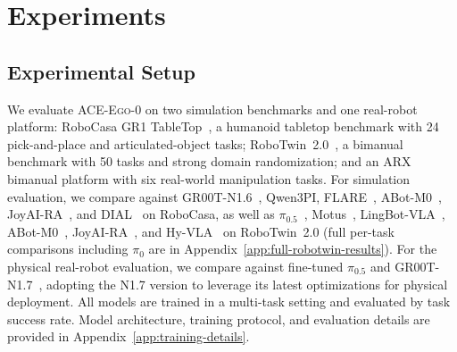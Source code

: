 \documentclass{llmxive}
\providecommand{\OURS}{\textsc{ACE-Ego-0}\xspace}
\providecommand{\Ours}{\OURS}
\begin{document}

\section{Experiments}

\subsection{Experimental Setup}
\label{sec:exp_setup}
We evaluate \Ours on two simulation benchmarks and one real-robot platform: RoboCasa GR1 TableTop~\cite{bjorck2025gr00t}, a humanoid tabletop benchmark with 24 pick-and-place and articulated-object tasks; RoboTwin~2.0~\cite{robotwin2.0}, a bimanual benchmark with 50 tasks and strong domain randomization; and an ARX bimanual platform with six real-world manipulation tasks. For simulation evaluation, we compare against GR00T-N1.6~\cite{bjorck2025gr00t}, Qwen3PI, FLARE~\cite{pmlr-v305-zheng25a}, ABot-M0~\cite{yang2026abot}, JoyAI-RA~\cite{zhang2026joyaira}, and DIAL~\cite{chen2026dial} on RoboCasa, as well as $\pi_{0.5}$~\cite{pmlr-v305-black25a}, Motus~\cite{bi2025motusunifiedlatentaction}, LingBot-VLA~\cite{wu2026pragmatic}, ABot-M0~\cite{yang2026abot}, JoyAI-RA~\cite{zhang2026joyaira}, and Hy-VLA~\cite{hunyuan2026hyembod} on RoboTwin~2.0 (full per-task comparisons including $\pi_0$ are in Appendix~\ref{app:full-robotwin-results}). For the physical real-robot evaluation, we compare against fine-tuned $\pi_{0.5}$ and GR00T-N1.7~\cite{bjorck2025gr00t}, adopting the N1.7 version to leverage its latest optimizations for physical deployment. All models are trained in a multi-task setting and evaluated by task success rate. Model architecture, training protocol, and evaluation details are provided in Appendix~\ref{app:training-details}.
\end{document}
